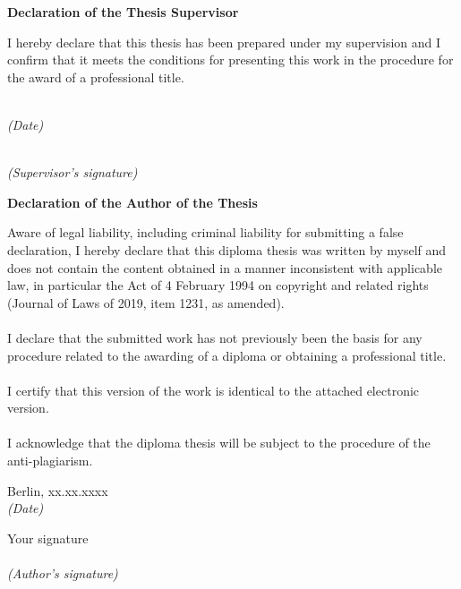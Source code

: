 \newpage

\begin{center}
    \textbf{Declaration of the Thesis Supervisor}
\end{center}
\noindent
I hereby declare that this thesis has been prepared under my supervision and I confirm that it meets the conditions for presenting this
work in the procedure for the award of a professional title.
\vspace{2cm}

\noindent
\begin{minipage}[t]{0.45\textwidth}
\dotfill\\
\textit{(Date)}
\end{minipage}%
\hfill
\begin{minipage}[t]{0.45\textwidth}
\dotfill\\
\textit{(Supervisor's signature)}
\end{minipage}

\vspace*{3cm}

\begin{center}
    \textbf{Declaration of the Author of the Thesis}
\end{center}
\noindent
Aware of legal liability, including criminal liability for submitting a false declaration,
I hereby declare that this diploma thesis was written by myself and does not contain the content obtained
in a manner inconsistent with applicable law, in particular the Act of 4 February 1994 on copyright and related
rights (Journal of Laws of 2019, item 1231, as amended). \\
\\
I declare that the submitted work has not previously been the basis for any procedure related to the awarding of a
diploma or obtaining a professional title. \\
\\
I certify that this version of the work is identical to the attached electronic version. \\
\\
I acknowledge that the diploma thesis will be subject to the procedure of the anti-plagiarism.
\vspace{2cm}

\noindent
\begin{minipage}[t]{0.45\textwidth}
Berlin, xx.xx.xxxx \\[-0.5\baselineskip]
\makebox[\linewidth]{\dotfill}
\textit{ (Date)}
\end{minipage}%
\hfill
\begin{minipage}[t]{0.45\textwidth}
Your signature \\[-0.5\baselineskip]
\makebox[\linewidth]{\dotfill}\\
\textit{(Author's signature)}
\end{minipage}